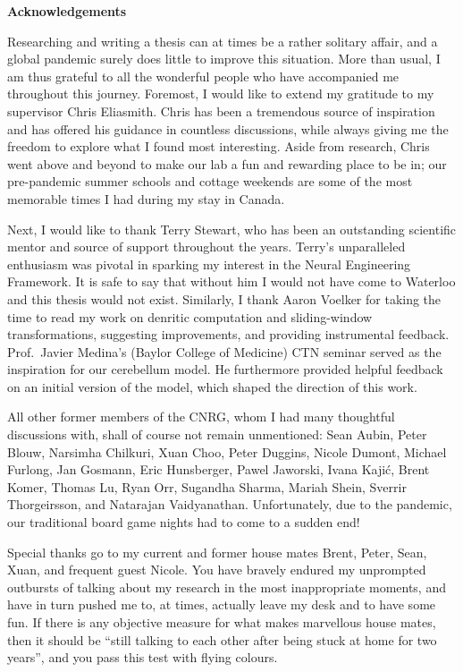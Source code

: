 {}
\begin{center}\textbf{Acknowledgements}\end{center}

Researching and writing a thesis can at times be a rather solitary affair, and a global pandemic surely does little to improve this situation.
More than usual, I am thus grateful to all the wonderful people who have accompanied me throughout this journey.
Foremost, I would like to extend my gratitude to my supervisor Chris Eliasmith.
Chris has been a tremendous source of inspiration and has offered his guidance in countless discussions, while always giving me the freedom to explore what I found most interesting.
Aside from research, Chris went above and beyond to make our lab a fun and rewarding place to be in; our pre-pandemic summer schools and cottage weekends are some of the most memorable times I had during my stay in Canada.

Next, I would like to thank Terry Stewart, who has been an outstanding scientific mentor and source of support throughout the years.
Terry's unparalleled enthusiasm was pivotal in sparking my interest in the Neural Engineering Framework.
It is safe to say that without him I would not have come to Waterloo and this thesis would not exist.
Similarly, I thank Aaron Voelker for taking the time to read my work on denritic computation and sliding-window transformations, suggesting improvements, and providing instrumental feedback.
Prof.~Javier Medina's (Baylor College of Medicine) CTN seminar served as the inspiration for our cerebellum model.
He furthermore provided helpful feedback on an initial version of the model, which shaped the direction of this work.

All other former members of the CNRG, whom I had many thoughtful discussions with, shall of course not remain unmentioned: Sean Aubin, Peter Blouw, Narsimha Chilkuri, Xuan Choo, Peter Duggins, Nicole Dumont, Michael Furlong, Jan Gosmann, Eric Hunsberger, Pawel Jaworski, Ivana Kajić, Brent Komer, Thomas Lu, Ryan Orr, Sugandha Sharma, Mariah Shein, Sverrir Thorgeirsson, and Natarajan Vaidyanathan.
Unfortunately, due to the pandemic, our traditional board game nights had to come to a sudden end!

Special thanks go to my current and former house mates Brent, Peter, Sean, Xuan, and frequent guest Nicole.
You have bravely endured my unprompted outbursts of talking about my research in the most inappropriate moments, and have in turn pushed me to, at times, actually leave my desk and to have some fun.
If there is any objective measure for what makes marvellous house mates, then it should be \enquote{still talking to each other after being stuck at home for two years}, and you pass this test with flying colours.

